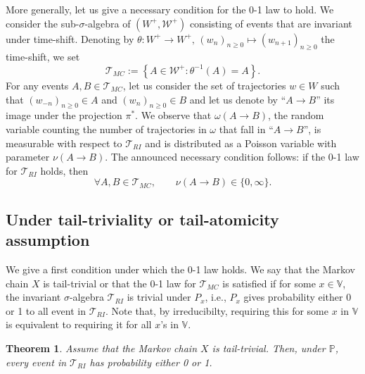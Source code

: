 \documentclass[12pt,a4paper]{article}
\newtheorem{theorem}[theo]{Theorem}
\newcommand{\1}[1]{{\mathbf 1}{\{#1\}}}
\newcommand{\bbP}{\mathbb{P}}
\newcommand{\8}{{\infty}}
\begin{document}
More generally, let us give a necessary condition for the 0-1 law to hold.  We consider the sub-$\sigma$-algebra of $(W^+,\mathcal{W}^+)$ consisting of events that are invariant under time-shift. Denoting by 
$\theta: W^+ \to W^+ , \, (w_n)_{n\ge 0}  \mapsto (w_{n+1})_{n\ge 0}$ the time-shift, we set
\begin{equation}
  \mathcal{T}_{MC}:=\left\{ A \in \mathcal{W}^+ : \theta^{-1}(A)=A \right\}.
\end{equation} 
For any events $A, B\in\mathcal{T}_{MC}$, let us consider the set of trajectories $w\in W$ such that $(w_{-n})_{n\ge 0}\in A$ and $(w_n)_{n\ge 0}\in B$ and let us denote by ``$A\rightarrow B$'' its image under the projection $\pi^*$. 
We observe that $\omega(A\to B)$, the random variable counting the number of trajectories in $\omega$ that fall in ``$A\rightarrow B$'', is measurable with respect to $\mathcal{T}_{RI}$ and is distributed as a Poisson variable with parameter $\nu(A\rightarrow B)$. 
The announced necessary condition follows: if the 0-1 law for $\mathcal{T}_{RI}$ holds, then
\begin{equation}\label{eq:necessary_cond}
  \forall A, B\in\mathcal{T}_{MC}, \qquad \nu(A\rightarrow B) \in \{0, \infty\}.
\end{equation}


\subsection{Under tail-triviality or tail-atomicity assumption}\label{sec:state_tail_assumptions}


We give a first condition under which the 0-1 law holds.
We say that the Markov chain $X$ is tail-trivial or that the 0-1 law for $\mathcal{T}_{MC}$ is satisfied if for some $x\in\mathbb{V}$, the invariant $\sigma$-algebra $\mathcal{T}_{RI}$ is trivial under $P_x$, i.e., $P_x$ gives probability either 0 or 1 to all event in $\mathcal{T}_{RI}$. Note that, by irreducibilty, requiring this for some $x$ in $\mathbb{V}$ is equivalent to requiring it for all $x$'s in $\mathbb{V}$. 

\begin{theorem}\label{th:tail_triviality}
Assume that the Markov chain $X$ is tail-trivial. Then, under $\bbP$, every event in $\mathcal{T}_{RI}$ has probability either 0 or 1.
\end{theorem}
\end{document}
